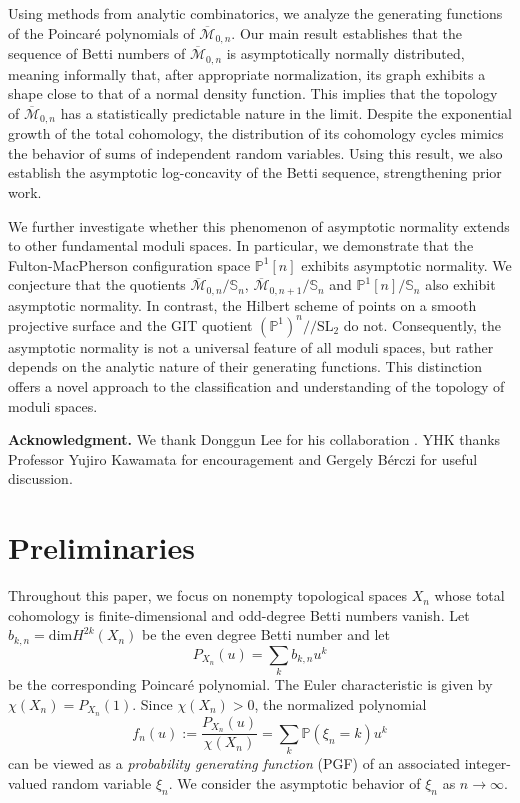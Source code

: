 \documentclass[11pt,letterpaper]{amsart}
\numberwithin{equation}{section}
\theoremstyle{definition}
\newcommand{\PP}{\mathbb{P}}
\newcommand{\cal}{\mathcal}
\def\cM{{\cal M}}
\def\mzn{\overline{\cM}_{0,n} }
\def\mzno{\overline{\cM}_{0,n+1} }
\def\SL{\mathrm{SL} }
\def\dim{\mathrm{dim} }
\def\symS{\mathbb{S}}
\begin{document}
Using methods from analytic combinatorics, we analyze the generating functions of the Poincar\'e polynomials of $\mzn$. Our main result establishes that the sequence of Betti numbers of $\mzn$ is asymptotically normally distributed, meaning informally that, after appropriate normalization, its graph exhibits a shape close to that of a normal density function. This implies that the topology of $\mzn$ has a statistically predictable nature in the limit. Despite the exponential growth of the total cohomology, the distribution of its cohomology cycles mimics the behavior of sums of independent random variables. Using this result, we also establish the asymptotic log-concavity of the Betti sequence, strengthening prior work.

We further investigate whether this phenomenon of asymptotic normality extends to other fundamental moduli spaces. In particular, we demonstrate that the Fulton-MacPherson configuration space $\PP^1[n]$ exhibits asymptotic normality. We conjecture that the quotients $\mzn/\symS_n$, $\mzno/\symS_n$ and $\PP^1[n]/\symS_n$ also exhibit asymptotic normality. In contrast, the Hilbert scheme of points on a smooth projective surface and the GIT quotient $(\PP^1)^n/\!\!/\SL_2$ do not.
Consequently, the asymptotic normality is not a universal feature of all moduli spaces, but rather depends on the analytic nature of their generating functions. This distinction offers a novel approach to the classification and understanding of the topology of moduli spaces.

\medskip

\noindent \textbf{Acknowledgment.}
We thank Donggun Lee for his collaboration \cite{CKL1,CKL2,CKL3}. YHK thanks Professor Yujiro Kawamata for encouragement and Gergely B\'erczi for useful discussion. 


\section{Preliminaries}
Throughout this paper, we focus on nonempty topological spaces $X_n$ whose total cohomology is finite-dimensional and odd-degree Betti numbers vanish. Let $b_{k,n} =\dim H^{2k}(X_n)$ be the even degree Betti number and let
\[ P_{X_n}(u) = \sum_k b_{k,n} u^k \]
be the corresponding Poincar\'{e} polynomial. The Euler characteristic is given by $\chi(X_n)=P_{X_n}(1)$. Since $\chi(X_n)>0$, the normalized polynomial 
\[f_n(u):=\frac{P_{X_n}(u)}{\chi(X_n)}=\sum_{k} \PP(\xi_n=k)u^k\]
can be viewed as a \emph{probability generating function} (PGF) of an associated integer-valued random variable $\xi_n$. We consider the asymptotic behavior of $\xi_n$ as $n\to \infty$.
\end{document}
